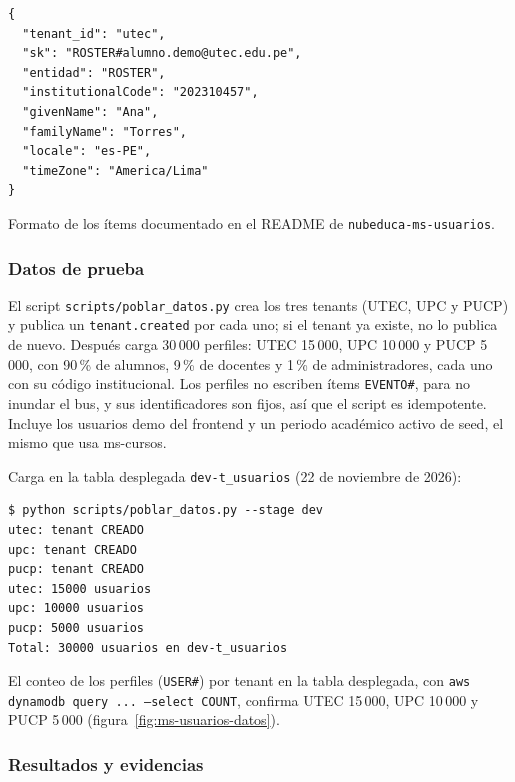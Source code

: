 \begin{lstlisting}
{
  "tenant_id": "utec",
  "sk": "ROSTER#alumno.demo@utec.edu.pe",
  "entidad": "ROSTER",
  "institutionalCode": "202310457",
  "givenName": "Ana",
  "familyName": "Torres",
  "locale": "es-PE",
  "timeZone": "America/Lima"
}
\end{lstlisting}

Formato de los ítems documentado en el README de \texttt{nubeduca-ms-usuarios}.

\subsubsection{Datos de prueba}
El script \texttt{scripts/poblar\_datos.py} crea los tres tenants (UTEC, UPC y PUCP) y publica un \texttt{tenant.created} por cada uno; si el tenant ya existe, no lo publica de nuevo. Después carga 30\,000 perfiles: UTEC 15\,000, UPC 10\,000 y PUCP 5\,000, con 90\,\% de alumnos, 9\,\% de docentes y 1\,\% de administradores, cada uno con su código institucional. Los perfiles no escriben ítems \texttt{EVENTO\#}, para no inundar el bus, y sus identificadores son fijos, así que el script es idempotente. Incluye los usuarios demo del frontend y un periodo académico activo de seed, el mismo que usa ms-cursos.

Carga en la tabla desplegada \texttt{dev-t\_usuarios} (22 de noviembre de 2026):

\begin{lstlisting}
$ python scripts/poblar_datos.py --stage dev
utec: tenant CREADO
upc: tenant CREADO
pucp: tenant CREADO
utec: 15000 usuarios
upc: 10000 usuarios
pucp: 5000 usuarios
Total: 30000 usuarios en dev-t_usuarios
\end{lstlisting}

El conteo de los perfiles (\texttt{USER\#}) por tenant en la tabla desplegada, con \texttt{aws dynamodb query ... --select COUNT}, confirma UTEC 15\,000, UPC 10\,000 y PUCP 5\,000 (figura~\ref{fig:ms-usuarios-datos}).


\subsubsection{Resultados y evidencias}
